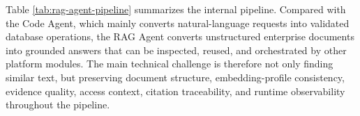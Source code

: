 Table \ref{tab:rag-agent-pipeline} summarizes the internal pipeline. Compared with the Code Agent, which mainly converts natural-language requests into validated database operations, the RAG Agent converts unstructured enterprise documents into grounded answers that can be inspected, reused, and orchestrated by other platform modules. The main technical challenge is therefore not only finding similar text, but preserving document structure, embedding-profile consistency, evidence quality, access context, citation traceability, and runtime observability throughout the pipeline.

\vspace{3mm}

\begin{table}[H]
\small\singlespacing
\centering
\caption{RAG Agent End-to-End Pipeline}
\label{tab:rag-agent-pipeline}
\vspace{2mm}


\end{table}
